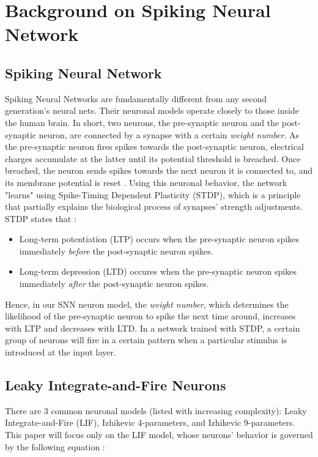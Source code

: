 \documentclass[11pt]{article}  %
\begin{document}
\section{Background on Spiking Neural Network}
\label{bg_snn}

\subsection{Spiking Neural Network}

Spiking Neural Networks are fundamentally different from any second generation's neural nets. Their neuronal models operate closely to those inside the human brain. In short, two neurons, the pre-synaptic neuron and the post-synaptic neuron, are connected by a synapse with a certain \textit{weight number}. As the pre-synaptic neuron fires spikes towards the post-synaptic neuron, electrical charges accumulate at the latter until its potential threshold is breached. Once breached, the neuron sends spikes towards the next neuron it is connected to, and its membrane potential is reset \cite{b3}. Using this neuronal behavior, the network "learns" using Spike-Timing Dependent Plasticity (STDP), which is a principle that partially explains the biological process of synapses' strength adjustments. STDP states that \cite{b4}:

\begin{itemize}
	\item Long-term potentiation (LTP) occurs when the pre-synaptic neuron spikes immediately \textit{before} the post-synaptic neuron spikes.
	\item Long-term depression (LTD) occures when the pre-synaptic neuron spikes immediately \textit{after} the post-synaptic neuron spikes.
\end{itemize}

Hence, in our SNN neuron model, the \textit{weight number}, which determines the likelihood of the pre-synaptic neuron to spike the next time around, increases with LTP and decreases with LTD. In a network trained with STDP, a certain group of neurons will fire in a certain pattern when a particular stimulus is introduced at the input layer. 

\subsection{Leaky Integrate-and-Fire Neurons}

There are 3 common neuronal models (listed with increasing complexity): Leaky Integrate-and-Fire (LIF), Izhikevic 4-parameters, and Izhikevic 9-parameters. This paper will focus only on the LIF model, whose neurons' behavior is governed by the following equation \cite{b5}:
\end{document}
